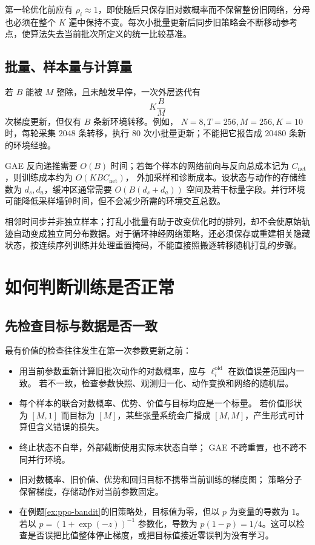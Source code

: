 \documentclass[UTF8]{ctexart}
\begin{document}
第一轮优化前应有 $\rho_i\approx1$，即使随后只保存旧对数概率而不保留整份旧网络，分母也必须在整个 $K$ 遍中保持不变。每次小批量更新后同步旧策略会不断移动参考点，使算法失去当前批次所定义的统一比较基准。

\subsection{批量、样本量与计算量}

若 $B$ 能被 $M$ 整除，且未触发早停，一次外层迭代有
\[
  K\frac BM
\]
次梯度更新，但仅有 $B$ 条新环境转移。例如，
$N=8,T=256,M=256,K=10$ 时，每轮采集 $2048$ 条转移，执行 $80$ 次小批量更新；不能把它报告成 $20480$ 条新的环境经验。

GAE 反向递推需要 $O(B)$ 时间；若每个样本的网络前向与反向总成本记为
$C_{\mathrm{net}}$，则训练成本约为 $O(KBC_{\mathrm{net}})$，
外加采样和诊断成本。设状态与动作的存储维数为 $d_s,d_a$，缓冲区通常需要
$O(B(d_s+d_a))$ 空间及若干标量字段。并行环境可能降低采样墙钟时间，但不会减少所需的环境交互总数。

相邻时间步并非独立样本；打乱小批量有助于改变优化时的排列，却不会使原始轨迹自动变成独立同分布数据。对于循环神经网络策略，还必须保存或重建相关隐藏状态，按连续序列训练并处理重置掩码，不能直接照搬逐转移随机打乱的步骤。

\section{如何判断训练是否正常}
\label{sec:ppo-diagnostics}

\subsection{先检查目标与数据是否一致}

最有价值的检查往往发生在第一次参数更新之前：
\begin{itemize}
  \item 用当前参数重新计算旧批次动作的对数概率，应与
  $\ell_i^{\mathrm{old}}$ 在数值误差范围内一致。
  若不一致，检查参数快照、观测归一化、动作变换和网络的随机层。
  \item 每个样本的联合对数概率、优势、价值与目标均应是一个标量。
  若价值形状为 $[M,1]$ 而目标为 $[M]$，某些张量系统会广播成
  $[M,M]$，产生形式可计算但含义错误的损失。
  \item 终止状态不自举，外部截断使用实际末状态自举；
  GAE 不跨重置，也不跨不同并行环境。
  \item 旧对数概率、旧价值、优势和回归目标不携带当前训练的梯度图；
  策略分子保留梯度，存储动作对当前参数固定。
  \item 在例题\ref{ex:ppo-bandit}的旧策略处，目标值为零，但以
  $p$ 为变量的导数为 $1$。
  若以 $p=(1+\exp(-z))^{-1}$ 参数化，导数为
  $p(1-p)=1/4$。这可以检查是否误把比值整体停止梯度，或把目标值接近零误判为没有学习。
\end{itemize}
\end{document}
